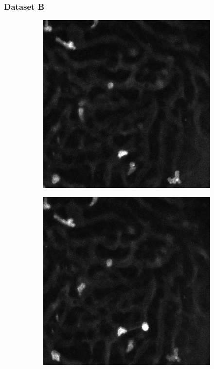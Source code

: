 	\subsubsection{Dataset B}
	\begin{figure}[h]
		\begin{subfigure}{.32\textwidth}
		\includegraphics[width=\textwidth]{images/series30red024}
		\end{subfigure}%
		\hfill
		\begin{subfigure}{.32\textwidth}
		\includegraphics[width=\textwidth]{images/series30red025}

\end{subfigure}
\end{figure}
